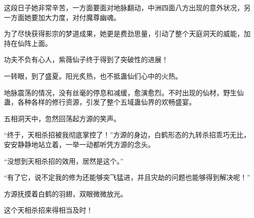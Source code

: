 \begin{this_body}
这段日子她非常辛苦，一方面要面对地脉翻动，中洲四面八方出现的意外状况，另一方面她要加大力度，对付魔尊幽魂。

为了尽快获得影宗的梦道成果，她更是费劲思量，引动了整个天庭洞天的威能，加持在仙阵上面。

功夫不负有心人，紫薇仙子终于得到了突破性的进展！

一转眼，到了盛夏。阳光炙热，也不抵蛊仙们心中的火热。

地脉震荡的情况，没有丝毫的停息和减缓，愈演愈烈。不时出现的仙材，野生仙蛊，各种各样的修行资源，引发了整个五域蛊仙界的欢畅盛宴。

五相洞天中，忽然回荡起方源的笑声。

“终于，天相杀招被我彻底掌控了！”方源的身边，白鹤形态的九转杀招乖巧无比，安安静静地站立着，一举一动都听凭方源的念头。

“没想到天相杀招的效用，居然是这个。”

“有了它，说不定我的修为还能够突飞猛进，并且灾劫的问题也能够得到解决呢！”

方源抚摸着白鹤的羽翅，双眼微微放光。

这个天相杀招来得相当及时！

\end{this_body}

